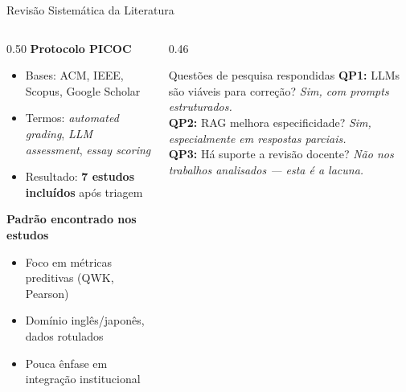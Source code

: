 \documentclass[10pt,aspectratio=169]{beamer}
\begin{document}
\begin{frame}{Revisão Sistemática da Literatura}
  \begin{columns}[T]
    \begin{column}{0.50\textwidth}
      \textbf{Protocolo PICOC}
      \begin{itemize}
        \item Bases: ACM, IEEE, Scopus, Google Scholar
        \item Termos: \textit{automated grading}, \textit{LLM assessment}, \textit{essay scoring}
        \item Resultado: \textbf{7 estudos incluídos} após triagem
      \end{itemize}
      \vspace{0.5em}
      \textbf{Padrão encontrado nos estudos}
      \begin{itemize}
        \item Foco em métricas preditivas (QWK, Pearson)
        \item Domínio inglês/japonês, dados rotulados
        \item Pouca ênfase em integração institucional
      \end{itemize}
    \end{column}
    \begin{column}{0.46\textwidth}
      \begin{block}{Questões de pesquisa respondidas}
        \small
        \textbf{QP1:} LLMs são viáveis para correção? \textit{Sim, com prompts estruturados.}\\[0.4em]
        \textbf{QP2:} RAG melhora especificidade? \textit{Sim, especialmente em respostas parciais.}\\[0.4em]
        \textbf{QP3:} Há suporte a revisão docente? \textit{Não nos trabalhos analisados — esta é a lacuna.}
      \end{block}
    \end{column}
  \end{columns}
\end{frame}
\end{document}
